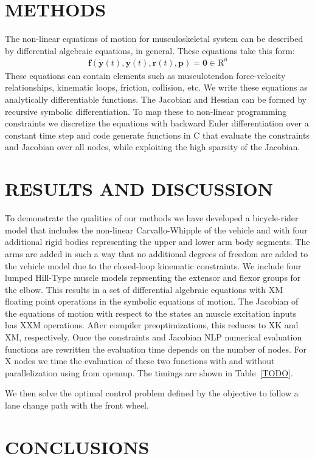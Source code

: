 \documentclass[11pt,twocolumn]{article}
\begin{document}
\section*{METHODS}
%
The non-linear equations of motion for musculoskeletal system can be described
by differential algebraic equations, in general. These equations take this
form:
%
\begin{align}
  \mathbf{f}(\dot{\mathbf{y}}(t), \mathbf{y}(t), \mathbf{r}(t), \mathbf{p}) =
  \mathbf{0} \in \mathrm{R}^n
\end{align}
%
These equations can contain elements such as musculotendon force-velocity
relationships, kinematic loops, friction, collision, etc. We write these
equations as analytically differentiable functions. The Jacobian and Hessian can
be formed by recursive symbolic differentiation. To map these to non-linear
programming constraints we discretize the equations with backward Euler
differentiation over a constant time step and code generate functions in C that
evaluate the constraints and Jacobian over all nodes, while exploiting the high
sparsity of the Jacobian.

\section*{RESULTS AND DISCUSSION}
%
To demonstrate the qualities of our methods we have developed a bicycle-rider
model that includes the non-linear Carvallo-Whipple of the vehicle and with
four additional rigid bodies representing the upper and lower arm body
segments. The arms are added in such a way that no additional degrees of
freedom are added to the vehicle model due to the closed-loop kinematic
constraints. We include four lumped Hill-Type muscle models reprsenting the
extensor and flexor groups for the elbow. This results in a set of differential
algebraic equations with XM floating point operations in the symbolic equations
of motion. The Jacobian of the equations of motion with respect to the states
an muscle excitation inputs has XXM operations. After compiler
preoptimizations, this reduces to XK and XM, respectively. Once the constraints
and Jacobian NLP numerical evaluation functions are rewritten the evaluation
time depends on the number of nodes. For X nodes we time the evaluation of
these two functions with and without parallelization using from openmp. The
timings are shown in Table~\ref{TODO}.

We then solve the optimal control problem defined by the objective to follow a
lane change path with the front wheel.

\section*{CONCLUSIONS}
\end{document}
